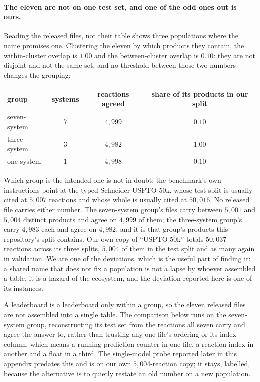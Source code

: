 \paragraph{The eleven are not on one test set, and one of the odd ones out is ours.}\label{app:xdomainsets}
Reading the released files, not their table shows three populations where the name promises
one. Clustering the eleven by which products they contain, the within-cluster overlap is $1.00$ and
the between-cluster overlap is $0.10$: they are not disjoint and not the same set, and no
threshold between those two numbers changes the grouping:

\begin{center}
\footnotesize
\begin{tabular}{lccc}
\toprule
group & systems & reactions agreed & share of its products in our split \\
\midrule
seven-system  & 7 & $4{,}999$ & $0.10$ \\
three-system  & 3 & $4{,}982$ & $1.00$ \\
one-system    & 1 & $4{,}998$ & $0.10$ \\
\bottomrule
\end{tabular}
\end{center}

Which group is the intended one is not in doubt: the benchmark's own instructions point at the typed
Schneider USPTO-50k, whose test split is usually cited at $5{,}007$ reactions and whose whole is
usually cited at $50{,}016$. No released file carries either number. The seven-system group's files
carry between $5{,}001$ and $5{,}004$ distinct products and agree on $4{,}999$ of them; the
three-system group's carry $4{,}983$ each and agree on $4{,}982$, and it is that group's products
this repository's split contains. Our own copy of ``USPTO-50k'' totals $50{,}037$ reactions across
its three splits, $5{,}004$ of them in the test split and as many again in validation. We are one of the deviations, which is the useful part of finding
it: a shared name that does not fix a population is not a lapse by whoever assembled a table, it is
a hazard of the ecosystem, and the deviation reported here is one of its instances.

A leaderboard is a leaderboard only within a group, so the eleven released files are not
assembled into a single table. The comparison below runs on the seven-system
group, reconstructing its test set from the reactions all seven carry and agree the answer to,
rather than trusting any one file's ordering or its index column, which means a running
prediction counter in one file, a reaction index in another and a float in a third. The
single-model probe reported later in this appendix predates this and is on our own $5{,}004$-reaction
copy; it stays, labelled, because the alternative is to quietly restate an old number on a new
population.

